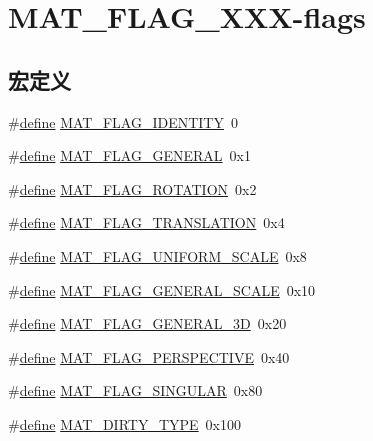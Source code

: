 \hypertarget{group___mat_flags}{}\section{M\+A\+T\+\_\+\+F\+L\+A\+G\+\_\+\+X\+X\+X-\/flags}
\label{group___mat_flags}
\subsection*{宏定义}
\begin{DoxyCompactItemize}
\item 
\#\hyperlink{structdefine}{define} \hyperlink{group___mat_flags_ga46c11f5e5ed8d400da4f5bb05aca0112}{M\+A\+T\+\_\+\+F\+L\+A\+G\+\_\+\+I\+D\+E\+N\+T\+I\+TY}~0
\item 
\#\hyperlink{structdefine}{define} \hyperlink{group___mat_flags_gafbc6bb67558ead333d77b39078073f43}{M\+A\+T\+\_\+\+F\+L\+A\+G\+\_\+\+G\+E\+N\+E\+R\+AL}~0x1
\item 
\#\hyperlink{structdefine}{define} \hyperlink{group___mat_flags_ga3dd0c612ad9a4c9c4ed5e2ff0e879368}{M\+A\+T\+\_\+\+F\+L\+A\+G\+\_\+\+R\+O\+T\+A\+T\+I\+ON}~0x2
\item 
\#\hyperlink{structdefine}{define} \hyperlink{group___mat_flags_ga0abc46abbd9895235ab498ab31185f3b}{M\+A\+T\+\_\+\+F\+L\+A\+G\+\_\+\+T\+R\+A\+N\+S\+L\+A\+T\+I\+ON}~0x4
\item 
\#\hyperlink{structdefine}{define} \hyperlink{group___mat_flags_ga5da236659e222eff1c0ebdb94c948f44}{M\+A\+T\+\_\+\+F\+L\+A\+G\+\_\+\+U\+N\+I\+F\+O\+R\+M\+\_\+\+S\+C\+A\+LE}~0x8
\item 
\#\hyperlink{structdefine}{define} \hyperlink{group___mat_flags_ga5f106ce9c0ec229289103dd5b7cdc65c}{M\+A\+T\+\_\+\+F\+L\+A\+G\+\_\+\+G\+E\+N\+E\+R\+A\+L\+\_\+\+S\+C\+A\+LE}~0x10
\item 
\#\hyperlink{structdefine}{define} \hyperlink{group___mat_flags_gaa154aca726c0da4fe90f5ba95d2becec}{M\+A\+T\+\_\+\+F\+L\+A\+G\+\_\+\+G\+E\+N\+E\+R\+A\+L\+\_\+3D}~0x20
\item 
\#\hyperlink{structdefine}{define} \hyperlink{group___mat_flags_ga94cf14e5c8dbb53cfac903e9f92f696c}{M\+A\+T\+\_\+\+F\+L\+A\+G\+\_\+\+P\+E\+R\+S\+P\+E\+C\+T\+I\+VE}~0x40
\item 
\#\hyperlink{structdefine}{define} \hyperlink{group___mat_flags_ga24714171aad96fb6b3a02e02384a0f0c}{M\+A\+T\+\_\+\+F\+L\+A\+G\+\_\+\+S\+I\+N\+G\+U\+L\+AR}~0x80
\item 
\#\hyperlink{structdefine}{define} \hyperlink{group___mat_flags_ga8e885b91f94c09a8b74bbd93acccc306}{M\+A\+T\+\_\+\+D\+I\+R\+T\+Y\+\_\+\+T\+Y\+PE}~0x100

\end{DoxyCompactItemize}
